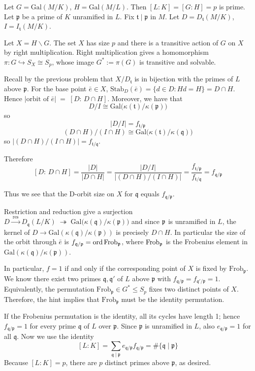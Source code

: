 \documentclass[12pt]{article}  %
\begin{document}
\begin{solution}
    Let $G=\mathrm{Gal}(M/K)$, $H=\mathrm{Gal}(M/L)$. Then $[L:K]=[G:H]=p$ is prime. Let $\mathfrak{p}$ be a prime of $K$ unramified in $L$. Fix $\mathfrak{t}\mid\mathfrak{p}$ in $M$. Let $D=D_{\mathfrak{t}}(M/K)$, $I=I_{\mathfrak{t}}(M/K)$.

    Let $X=H \backslash G$. The set $X$ has size $p$ and there is a transitive action of $G$ on $X$ by right multiplication. Right multiplication gives a homomorphism $\pi:G\hookrightarrow S_X\cong S_p$, whose image $G^\ast:=\pi(G)$ is transitive and solvable.

    Recall by the previous problem that $X/D_{\mathfrak{t}}$ is in bijection with the primes of $L$ above $\mathfrak{p}$. For the base point $\bar e\in X$, $\mathrm{Stab}_D(\bar e)=\{d\in D:H d=H\} = D\cap H$. Hence $|\text{orbit of }\bar e| \;=\; [D:\,D\cap H]$. Moreover, we have that
    \[D/I \cong \mathrm{Gal}\!\big(\kappa(\mathfrak t)/\kappa(\mathfrak p)\big)\] so \[|D/I|=f_{\mathfrak t/\mathfrak p}\]
    \[(D\cap H)/(I\cap H) \cong \mathrm{Gal}\!\big(\kappa(\mathfrak t)/\kappa(\mathfrak q)\big)\] so $|(D\cap H)/(I\cap H)|=f_{\mathfrak t/\mathfrak q}$.

    Therefore
    \[[D:\,D\cap H]
        =\frac{|D|}{|D\cap H|}
        =\frac{|D/I|}{|(D\cap H)/(I\cap H)|}
        =\frac{f_{\mathfrak t/\mathfrak p}}{f_{\mathfrak t/\mathfrak q}}
        = f_{\mathfrak q/\mathfrak p}\]

    Thus we see that the D-orbit size on $X$ for $\mathfrak q$ equals $f_{\mathfrak q/\mathfrak p}$.

    Restriction and reduction give a surjection $D \xrightarrow{\ \mathrm{res}\ } D_{\mathfrak q}(L/K) \;\twoheadrightarrow\; \mathrm{Gal}\!\big(\kappa(\mathfrak q)/\kappa(\mathfrak p)\big)$ and since $\mathfrak{p}$ is unramified in $L$, the kernel of $D \to \mathrm{Gal}(\kappa(\mathfrak q)/\kappa(\mathfrak p))$ is precisely $D\cap H$. In particular the size of the orbit through $\bar e$ is $f_{\mathfrak q/\mathfrak p} = \operatorname{ord} \operatorname{Frob}_{\mathfrak p}$, where $\operatorname{Frob}_{\mathfrak p}$ is the Frobenius element in $\mathrm{Gal}(\kappa(\mathfrak q)/\kappa(\mathfrak p))$.

In particular, $f=1$ if and only if the corresponding point of $X$ is fixed by $\mathrm{Frob}_{\mathfrak{p}}$. We know there exist two primes $\mathfrak{q},\mathfrak{q}'$ of $L$ above $\mathfrak{p}$ with $f_{\mathfrak{q}/\mathfrak{p}}=f_{\mathfrak{q}'/\mathfrak{p}}=1$. Equivalently, the permutation $\mathrm{Frob}_{\mathfrak{p}}\in G^\ast\le S_p$ fixes two distinct points of $X$. Therefore, the hint implies that $\mathrm{Frob}_{\mathfrak{p}}$ must be the identity permutation.

If the Frobenius permutation is the identity, all its cycles have length 1; hence $f_{\mathfrak{q}/\mathfrak{p}}=1$ for every prime $\mathfrak{q}$ of $L$ over $\mathfrak{p}$. Since $\mathfrak{p}$ is unramified in $L$, also $e_{\mathfrak{q}/\mathfrak{p}}=1$ for all $\mathfrak{q}$. Now we use the identity \[[L:K]=\sum_{\mathfrak{q}\mid\mathfrak{p}} e_{\mathfrak{q}/\mathfrak{p}} f_{\mathfrak{q}/\mathfrak{p}} =\#\{\mathfrak{q}\mid\mathfrak{p}\}\] Because $[L:K]=p$, there are $p$ distinct primes above $\mathfrak{p}$, as desired.
\end{solution}
\end{document}
